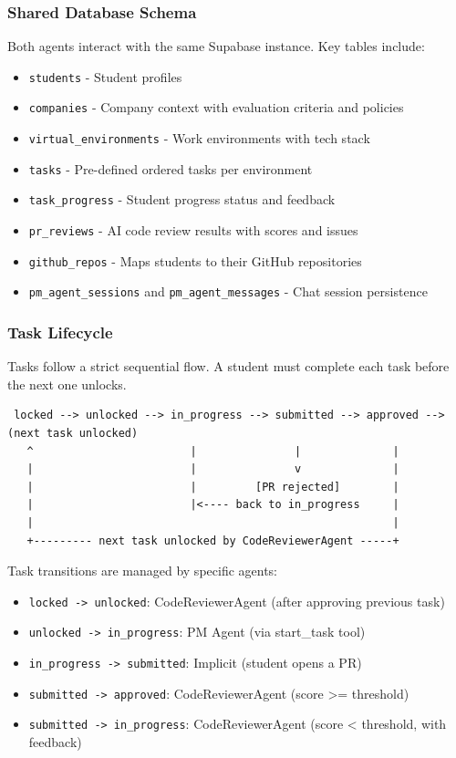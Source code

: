 \documentclass[12pt,a4paper]{report}
\begin{document}
\subsubsection{Shared Database Schema}

Both agents interact with the same Supabase instance. Key tables include:

\begin{itemize}
    \item \texttt{students} - Student profiles
    \item \texttt{companies} - Company context with evaluation criteria and policies
    \item \texttt{virtual\_environments} - Work environments with tech stack
    \item \texttt{tasks} - Pre-defined ordered tasks per environment
    \item \texttt{task\_progress} - Student progress status and feedback
    \item \texttt{pr\_reviews} - AI code review results with scores and issues
    \item \texttt{github\_repos} - Maps students to their GitHub repositories
    \item \texttt{pm\_agent\_sessions} and \texttt{pm\_agent\_messages} - Chat session persistence
\end{itemize}

\subsubsection{Task Lifecycle}

Tasks follow a strict sequential flow. A student must complete each task before the next one unlocks.

\begin{verbatim}
 locked --> unlocked --> in_progress --> submitted --> approved --> (next task unlocked)
   ^                        |               |              |
   |                        |               v              |
   |                        |         [PR rejected]        |
   |                        |<---- back to in_progress     |
   |                                                       |
   +--------- next task unlocked by CodeReviewerAgent -----+
\end{verbatim}

Task transitions are managed by specific agents:
\begin{itemize}
    \item \texttt{locked -> unlocked}: CodeReviewerAgent (after approving previous task)
    \item \texttt{unlocked -> in\_progress}: PM Agent (via start\_task tool)
    \item \texttt{in\_progress -> submitted}: Implicit (student opens a PR)
    \item \texttt{submitted -> approved}: CodeReviewerAgent (score >= threshold)
    \item \texttt{submitted -> in\_progress}: CodeReviewerAgent (score < threshold, with feedback)
\end{itemize}
\end{document}
